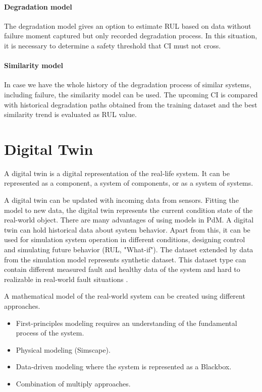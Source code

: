 \paragraph{Degradation model}
The degradation model gives an option to estimate RUL based on data without
failure moment captured but only recorded degradation process. In this
situation, it is necessary to determine a safety threshold that CI must not
cross.

\paragraph{Similarity model}
In case we have the whole history of the degradation process of similar
systems, including failure, the similarity model can be used. The upcoming
CI is compared with historical degradation paths obtained from the training
dataset and the best similarity trend is evaluated as RUL value.

\section{Digital Twin}\label{sec:digital_twin}
A digital twin is a digital representation of the real-life system. It can
be represented as a component, a system of components, or as a system of
systems. 

A digital twin can be updated with incoming data from sensors.
Fitting the model to new data, the digital twin represents the current
condition state of the real-world object.  There are many advantages of
using models in PdM. A digital twin can hold historical data about system
behavior. Apart from this, it can be used for simulation system operation
in different conditions, designing control and simulating future behavior
(RUL, "What-if"). The dataset extended by data from the simulation model
represents synthetic dataset. This dataset type can contain different
measured fault and healthy data of the system and hard to realizable in
real-world fault situations \cite{digit_twin}. 

A mathematical model of the real-world system can be created using
different approaches. 
\begin{itemize}
    \item First-principles modeling requires an understanding of the
        fundamental process of the system.
    \item Physical modeling (Simscape).
    \item Data-driven modeling where the system is represented as a Blackbox.
    \item Combination of multiply approaches.
\end{itemize}

